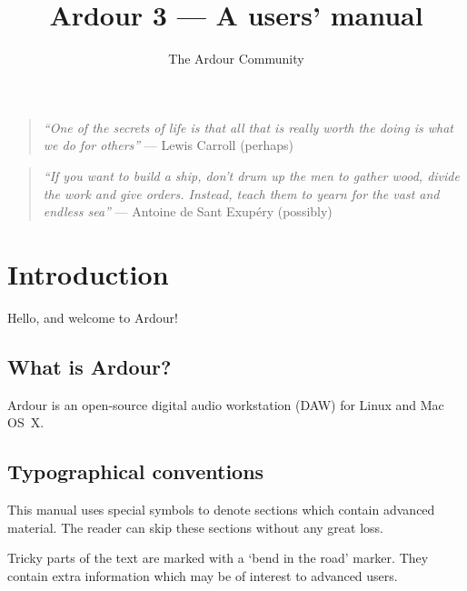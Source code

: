 \documentclass[10pt,a4paper]{book}
\title{Ardour 3 --- A users' manual}
\author{The Ardour Community}
\date{}
\begin{document}
\maketitle


\clearpage
\thispagestyle{empty}

\bigskip
\bigskip
\bigskip

\begin{quote}
\emph{``One of the secrets of life is that all that is really worth the doing is what we do for others''} --- Lewis Carroll (perhaps)
\end{quote}

\bigskip
\bigskip
\bigskip

\begin{quote}
\emph{``If you want to build a ship, don't drum up the men to gather wood, divide the work and give orders.  Instead, teach them to yearn for the vast and endless sea''} --- Antoine de Sant Exup\'ery (possibly)
\end{quote}

\bigskip

\tableofcontents



\chapter{Introduction}

Hello, and welcome to Ardour!

\section{What is Ardour?}

Ardour is an open-source digital audio workstation (DAW) for Linux and
Mac OS~X.

\section{Typographical conventions}

This manual uses special symbols to denote sections which contain
advanced material.  The reader can skip these sections without any
great loss.

\begin{danger}
Tricky parts of the text are marked with a `bend in the road' marker.
They contain extra information which may be of interest to advanced
users.
\end{danger}
\end{document}
